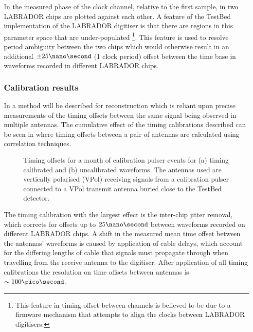 In  the measured phase of the clock channel, relative to the first sample, in two LABRADOR chips are plotted against each other. A feature of the TestBed implementation of the LABRADOR digitiser is that there are regions in this parameter space that are under-populated \footnote{This feature in timing offset between channels is believed to be due to a firmware mechanism that attempts to align the clocks between LABRADOR digitisers.}. This feature is used to resolve period ambiguity between the two chips which would otherwise result in an additional $\pm 25 \nano \second$ (1 clock period) offset between the time base in waveforms recorded in different LABRADOR chips.



\subsubsection{Calibration results}
\label{sec:calibration:LABRADOR-Digitiser-Chip:Calibration-results}

In  a method will be described for reconstruction which is reliant upon precise measurements of the timing offsets between the same signal being observed in multiple antennas. The cumulative effect of the timing calibrations described can be seen in  where timing offsets between a pair of antennas are calculated using correlation techniques.

\begin{figure}[htpb]
  \hfill
  \caption{Timing offsets for a month of calibration pulser events for (a) timing calibrated and (b) uncalibrated waveforms. The antennas used are vertically polarised (VPol) receiving signals from a calibration pulser connected to a VPol transmit antenna buried close to the TestBed detector.}
  \label{fig:calibration:LABRADOR-Digitiser-Chip:Timing-Differences}
\end{figure}

The timing calibration with the largest effect is the inter-chip jitter removal, which corrects for offsets up to $25 \nano \second$ between waveforms recorded on different LABRADOR chips. A shift in the measured mean time offset between the antennas' waveforms is caused by application of cable delays, which account for the differing lengths of cable that signals must propagate through when travelling from the receive antenna to the digitiser. After application of all timing calibrations the resolution on time offsets between antennas is $\sim 100 \pico \second$.


